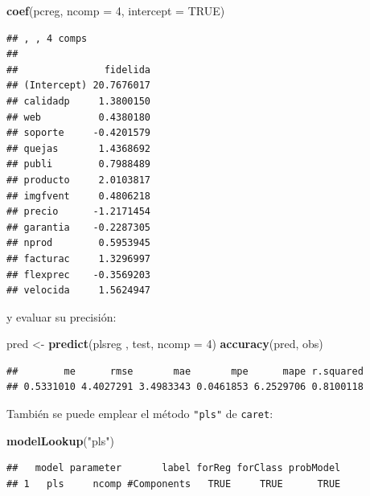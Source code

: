 \documentclass[
  spanish,
]{book}
\newenvironment{Shaded}{\begin{snugshade}}{\end{snugshade}}
\newcommand{\DataTypeTok}[1]{\textcolor[rgb]{0.13,0.29,0.53}{#1}}
\newcommand{\DecValTok}[1]{\textcolor[rgb]{0.00,0.00,0.81}{#1}}
\newcommand{\KeywordTok}[1]{\textcolor[rgb]{0.13,0.29,0.53}{\textbf{#1}}}
\newcommand{\NormalTok}[1]{#1}
\newcommand{\OtherTok}[1]{\textcolor[rgb]{0.56,0.35,0.01}{#1}}
\newcommand{\StringTok}[1]{\textcolor[rgb]{0.31,0.60,0.02}{#1}}
\theoremstyle{break}
\theoremstyle{definition}
\theoremstyle{definition}
\theoremstyle{definition}
\theoremstyle{remark}
\begin{document}
\begin{Shaded}
\begin{Highlighting}[]
\KeywordTok{coef}\NormalTok{(pcreg, }\DataTypeTok{ncomp =} \DecValTok{4}\NormalTok{, }\DataTypeTok{intercept =} \OtherTok{TRUE}\NormalTok{)}
\end{Highlighting}
\end{Shaded}

\begin{verbatim}
## , , 4 comps
## 
##               fidelida
## (Intercept) 20.7676017
## calidadp     1.3800150
## web          0.4380180
## soporte     -0.4201579
## quejas       1.4368692
## publi        0.7988489
## producto     2.0103817
## imgfvent     0.4806218
## precio      -1.2171454
## garantia    -0.2287305
## nprod        0.5953945
## facturac     1.3296997
## flexprec    -0.3569203
## velocida     1.5624947
\end{verbatim}

y evaluar su precisión:

\begin{Shaded}
\begin{Highlighting}[]
\NormalTok{pred <-}\StringTok{ }\KeywordTok{predict}\NormalTok{(plsreg , test, }\DataTypeTok{ncomp =} \DecValTok{4}\NormalTok{)}
\KeywordTok{accuracy}\NormalTok{(pred, obs)}
\end{Highlighting}
\end{Shaded}

\begin{verbatim}
##        me      rmse       mae       mpe      mape r.squared 
## 0.5331010 4.4027291 3.4983343 0.0461853 6.2529706 0.8100118
\end{verbatim}

También se puede emplear el método \texttt{"pls"} de \texttt{caret}:

\begin{Shaded}
\begin{Highlighting}[]
\KeywordTok{modelLookup}\NormalTok{(}\StringTok{"pls"}\NormalTok{)}
\end{Highlighting}
\end{Shaded}

\begin{verbatim}
##   model parameter       label forReg forClass probModel
## 1   pls     ncomp #Components   TRUE     TRUE      TRUE
\end{verbatim}
\end{document}
